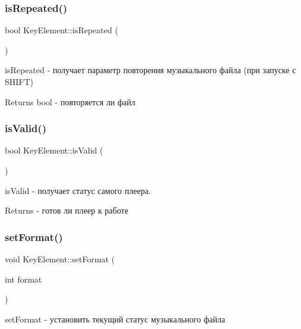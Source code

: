 \subsubsection{\texorpdfstring{is\+Repeated()}{isRepeated()}}
{\footnotesize\ttfamily bool Key\+Element\+::is\+Repeated (\begin{DoxyParamCaption}{ }\end{DoxyParamCaption})}



is\+Repeated -\/ получает параметр повторения музыкального файла (при запуске с S\+H\+I\+FT) 

\begin{DoxyReturn}{Returns}
bool -\/ повторяется ли файл 
\end{DoxyReturn}
\mbox{\label{class_key_element_ae4ec608b097cae6a325cbfc0d70ac01d}} 
\subsubsection{\texorpdfstring{is\+Valid()}{isValid()}}
{\footnotesize\ttfamily bool Key\+Element\+::is\+Valid (\begin{DoxyParamCaption}{ }\end{DoxyParamCaption})}



is\+Valid -\/ получает статус самого плеера. 

\begin{DoxyReturn}{Returns}
-\/ готов ли плеер к работе 
\end{DoxyReturn}
\mbox{\label{class_key_element_aaee575ca9fabebd253806da9dcdc512f}} 
\subsubsection{\texorpdfstring{set\+Format()}{setFormat()}}
{\footnotesize\ttfamily void Key\+Element\+::set\+Format (\begin{DoxyParamCaption}\item[{int}]{format }\end{DoxyParamCaption})}



set\+Format -\/ установить текущий статус музыкального файла 


